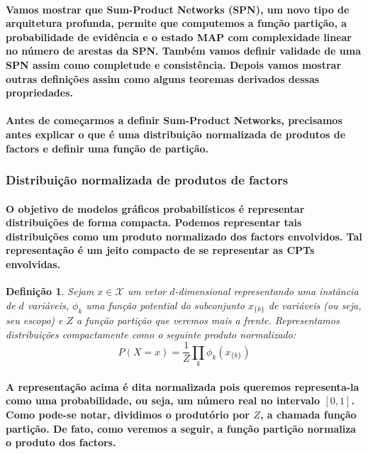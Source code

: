 \documentclass[a4paper,10pt]{article}
\theoremstyle{plain}
\newtheorem{spn-def}{Definição}
\begin{document}
\paragraph{
  Vamos mostrar que Sum-Product Networks (SPN), um novo tipo de arquitetura profunda, permite que
  computemos a função partição, a probabilidade de evidência e o estado MAP\cite{report-1} com
  complexidade linear no número de arestas da SPN. Também vamos definir validade de uma SPN assim
  como completude e consistência. Depois vamos mostrar outras definições assim como alguns teoremas
  derivados dessas propriedades.
}

\paragraph{
  Antes de começarmos a definir Sum-Product Networks, precisamos antes explicar o que é uma
  distribuição normalizada de produtos de factors e definir uma função de partição.
}

\subsubsection{Distribuição normalizada de produtos de factors}

\paragraph{
  O objetivo de modelos gráficos probabilísticos é representar distribuições de forma compacta.
  Podemos representar tais distribuições como um produto normalizado dos factors\cite{report-2}
  envolvidos. Tal representação é um jeito compacto de se representar as CPTs envolvidas.
}

\begin{spn-def} Sejam $x \in \mathcal{X}$ um vetor $d$-dimensional representando uma instância de
  $d$ variáveis, $\phi_k$ uma função potential\cite{report-2} do subconjunto $x_{\{k\}}$ de
  variáveis (ou seja, seu escopo\cite{project-def}) e $Z$ a função partição que veremos mais a
  frente. Representamos distribuições compactamente como o seguinte produto normalizado:
  \begin{equation}
    P(X = x) = \frac{1}{Z} \prod_k \phi_k (x_{\{k\}})
  \end{equation}
\end{spn-def}

\paragraph{
  A representação acima é dita normalizada pois queremos representa-la como uma probabilidade, ou
  seja, um número real no intervalo $[0, 1]$. Como pode-se notar, dividimos o produtório por $Z$,
  a chamada função partição. De fato, como veremos a seguir, a função partição normaliza o produto
  dos factors.
}
\end{document}
